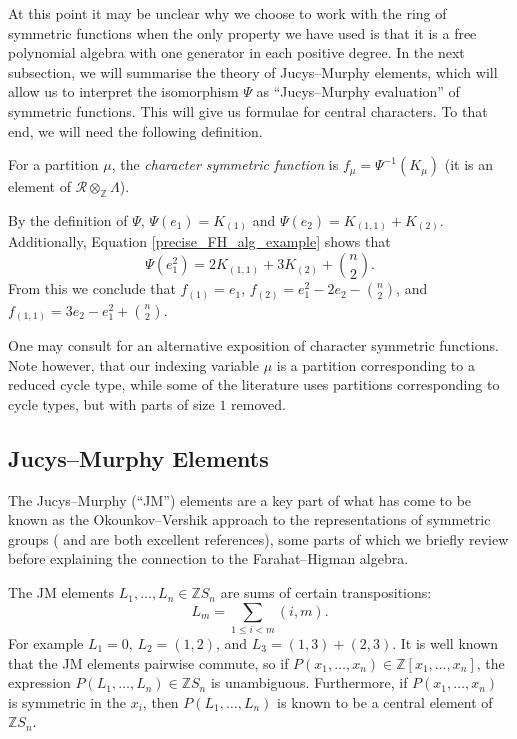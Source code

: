 At this point it may be unclear why we choose to work with the ring of symmetric functions when the only property we have used is that it is a free polynomial algebra with one generator in each positive degree. In the next subsection, we will summarise the theory of Jucys--Murphy elements, which will allow us to interpret the isomorphism $\Psi$ as ``Jucys--Murphy evaluation'' of symmetric functions. This will give us formulae for central characters. To that end, we will need the following definition.
\begin{definition} \label{char_sym_fun_def}
For a partition $\mu$, the \emph{character symmetric function} is $f_\mu = \Psi^{-1}(K_\mu)$ \textup{(}it is an element of $\mathcal{R} \otimes_{\mathbb{Z}} \Lambda$\textup{)}.
\end{definition}
\begin{example} \label{char_sym_fn_example}
By the definition of $\Psi$, $\Psi(e_1) = K_{(1)}$ and $\Psi(e_2) = K_{(1,1)} + K_{(2)}$. Additionally, Equation \eqref{precise_FH_alg_example} shows that 
\[
\Psi(e_1^2) = 2 K_{(1,1)} + 3K_{(2)} + \binom{n}{2}.
\]
From this we conclude that $f_{(1)} = e_1$, $f_{(2)} = e_1^2 - 2e_2 - \binom{n}{2}$, and $f_{(1,1)} = 3e_2 - e_1^2 + \binom{n}{2}$.
\end{example}


One may consult  \cite[Section 5.4]{CST} for an alternative exposition of character symmetric functions. Note however, that our indexing variable $\mu$ is a partition corresponding to a reduced cycle type, while some of the literature uses partitions corresponding to cycle types, but with parts of size $1$ removed.

\subsection{Jucys--Murphy Elements} The Jucys--Murphy (``JM'') elements are a key part of what has come to be known as the Okounkov--Vershik approach to the representations of symmetric groups (\cite{OkounkovVershik} and \cite{Kleshchev} are both excellent references), some parts of which we briefly review before explaining the connection to the Farahat--Higman algebra.

The JM elements $L_1, \ldots, L_n \in \mathbb{Z}S_n$ are sums of certain transpositions:
\[
L_m = \sum_{1\leq i < m} (i,m).
\]
For example $L_1 = 0$, $L_2 = (1,2)$, and $L_3 = (1,3)+(2,3)$. It is well known that the JM elements pairwise commute, so if $P(x_1, \ldots, x_n) \in \mathbb{Z}[x_1, \ldots, x_n]$, the expression $P(L_1, \ldots, L_n) \in \mathbb{Z}S_n$ is unambiguous. Furthermore, if $P(x_1, \ldots, x_n)$ is symmetric in the $x_i$, then $P(L_1, \ldots, L_n)$ is known to be a central element of $\mathbb{Z}S_n$.


